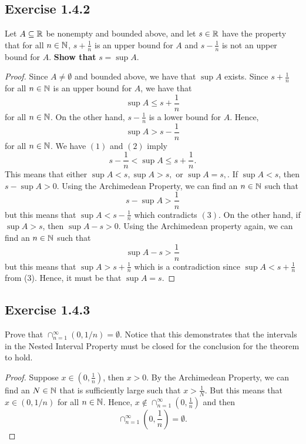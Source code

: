 \subsection{Exercise 1.4.2} 
    Let \( A \subseteq \mathbb{R} \) be nonempty and bounded above, and let \( s \in \mathbb{R} \) have the property that for all \( n \in \mathbb{N} \), \( s + \frac{1}{n} \) is an upper bound for \( A \) and \( s - \frac{1}{n} \) is not an upper bound for \( A \). \textbf{Show that } \( s = \sup A \).
        
    
    \begin{proof}
        Since \( A \neq \emptyset \) and bounded above, we have that \( \sup A \) exists. Since \( s + \frac{1}{n} \) for all \( n \in \mathbb{N} \) is an upper bound for \( A \), we have that 
        \[ \sup A \leq s + \frac{1}{n} \tag{1} \]
        for all \( n \in \mathbb{N} \). On the other hand, \( s - \frac{1}{n} \) is a lower bound for \( A \). Hence, 
        \[ \sup A > s - \frac{1}{n} \tag{2} \]
        for all \( n \in \mathbb{N} \). We have \( (1) \) and \( (2) \) imply 
        \[ s - \frac{1}{n} < \sup A \leq s + \frac{1}{n}. \tag{3} \]
        This means that either \( \sup A < s, \sup A > s, \) or \( \sup A = s, \). 
        If \( \sup A < s  \), then \( s - \sup A > 0 \). Using the Archimedean Property, we can find an \( n \in \mathbb{N} \) such that 
        \[ s - \sup A > \frac{1}{n}\]
        but this means that \( \sup  A < s - \frac{ 1}{n}\) which contradicts \( (3) \). On the other hand, if \( \sup A > s \), then \( \sup A - s > 0 \). Using the Archimedean property again, we can find an \( n \in \mathbb{N} \) such that 
        \[ \sup A - s > \frac{1}{n} \]
        but this means that \( \sup A > s + \frac{1}{n} \) which is a contradiction since \( \sup A < s + \frac{1}{n} \) from (3). Hence, it must be that \( \sup A = s \). 
    \end{proof}
    
\subsection{Exercise 1.4.3}
    Prove that \( \cap_{n=1}^{\infty} (0,1/n) = \emptyset \). Notice that this demonstrates that the intervals in the Nested Interval Property must be closed for the conclusion for the theorem to hold. 
    \begin{proof}
        Suppose \( x \in (0,\frac{1}{n}) \), then \( x > 0 \). By the Archimedean Property, we can find an \( N \in \mathbb{N} \) that is sufficiently large such that \( x > \frac{1}{N} \). But this means that \( x \in (0, 1/n )\) for all \( n \in \mathbb{N}  \). Hence, \( x \not\in \cap_{n=1}^{\infty} (0,\frac{1}{n})\) and then 
        \[ \cap_{n=1}^{\infty} (0,\frac{1}{n}) = \emptyset.\]
    \end{proof}
    
